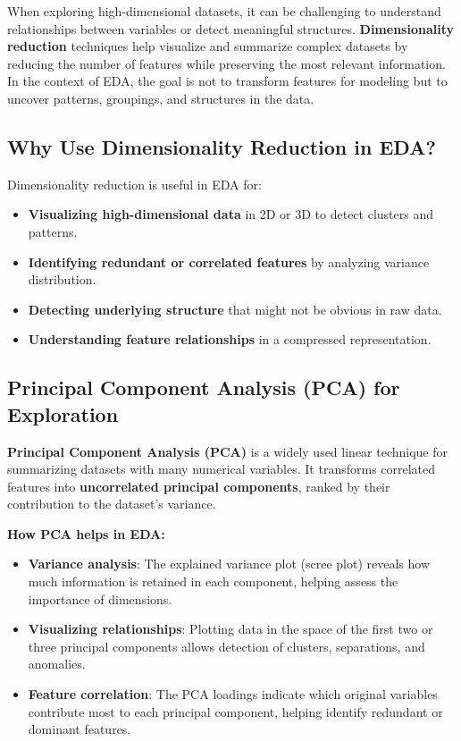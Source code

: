 \documentclass[12pt,openany]{book}
\begin{document}
When exploring high-dimensional datasets, it can be challenging to understand relationships between variables or detect meaningful structures. \textbf{Dimensionality reduction} techniques help visualize and summarize complex datasets by reducing the number of features while preserving the most relevant information. In the context of EDA, the goal is not to transform features for modeling but to uncover patterns, groupings, and structures in the data.


\subsection{Why Use Dimensionality Reduction in EDA?}

Dimensionality reduction is useful in EDA for:
\begin{itemize}
    \item \textbf{Visualizing high-dimensional data} in 2D or 3D to detect clusters and patterns.
    \item \textbf{Identifying redundant or correlated features} by analyzing variance distribution.
    \item \textbf{Detecting underlying structure} that might not be obvious in raw data.
    \item \textbf{Understanding feature relationships} in a compressed representation.
\end{itemize}


\subsection{Principal Component Analysis (PCA) for Exploration}

\textbf{Principal Component Analysis (PCA)} is a widely used linear technique for summarizing datasets with many numerical variables. It transforms correlated features into \textbf{uncorrelated principal components}, ranked by their contribution to the dataset’s variance.

\textbf{How PCA helps in EDA:}
\begin{itemize}
    \item \textbf{Variance analysis}: The explained variance plot (scree plot) reveals how much information is retained in each component, helping assess the importance of dimensions.
    \item \textbf{Visualizing relationships}: Plotting data in the space of the first two or three principal components allows detection of clusters, separations, and anomalies.
    \item \textbf{Feature correlation}: The PCA loadings indicate which original variables contribute most to each principal component, helping identify redundant or dominant features.
\end{itemize}
\end{document}
